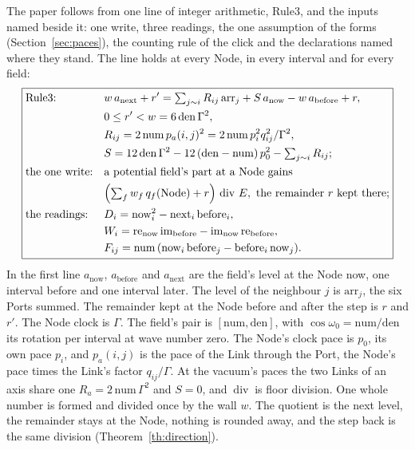 \documentclass[pdflatex,sn-mathphys-num]{sn-jnl}
\newcommand{\num}{\mathrm{num}}
\newcommand{\den}{\mathrm{den}}
\newcommand{\anow}{a_{\mathrm{now}}}
\newcommand{\abefore}{a_{\mathrm{before}}}
\newcommand{\anext}{a_{\mathrm{next}}}
\newcommand{\ddiv}{\ \mathrm{div}\ }
\theoremstyle{thmstyleone}
\theoremstyle{thmstyletwo}
\begin{document}
The paper follows from one line of integer arithmetic, Rule3, and the inputs named beside it: one write, three readings, the one assumption of the forms (Section~\ref{sec:paces}), the counting rule of the click and the declarations named where they stand. The line holds at every Node, in every interval and for every field:
\begin{equation}\label{eq:law}
\boxed{\begin{aligned}
&\text{Rule3:} && w\,\anext + r' = \textstyle\sum_{j \sim i} R_{ij}\,\mathrm{arr}_j + S\,\anow - w\,\abefore + r,\\
&&& 0 \le r' < w = 6\,\den\,\Gamma^2,\\
&&& R_{ij} = 2\,\num\,p_a(i, j)^2 = 2\,\num\,p_i^2 q_{ij}^2 / \Gamma^2,\\
&&& S = 12\,\den\,\Gamma^2 - 12\,(\den - \num)\,p_0^2 - \textstyle\sum_{j \sim i} R_{ij};\\
&\text{the one write:} && \text{a potential field's part at a Node gains}\\
&&& \Bigl(\textstyle\sum_f w_f\,q_f(\text{Node}) + r\Bigr) \ddiv E, \text{ the remainder } r \text{ kept there};\\
&\text{the readings:} && D_i = \mathrm{now}_i^2 - \mathrm{next}_i\,\mathrm{before}_i,\\
&&& W_i = \mathrm{re}_{\mathrm{now}}\,\mathrm{im}_{\mathrm{before}} - \mathrm{im}_{\mathrm{now}}\,\mathrm{re}_{\mathrm{before}},\\
&&& F_{ij} = \num\,(\mathrm{now}_i\,\mathrm{before}_j - \mathrm{before}_i\,\mathrm{now}_j).
\end{aligned}}
\end{equation}
In the first line $\anow$, $\abefore$ and $\anext$ are the field's level at the Node now, one interval before and one interval later. The level of the neighbour $j$ is $\mathrm{arr}_j$, the six Ports summed. The remainder kept at the Node before and after the step is $r$ and $r'$. The Node clock is $\Gamma$. The field's pair is $[\num, \den]$, with $\cos\omega_0 = \num / \den$ its rotation per interval at wave number zero. The Node's clock pace is $p_0$, its own pace $p_i$, and $p_a(i, j)$ is the pace of the Link through the Port, the Node's pace times the Link's factor $q_{ij} / \Gamma$. At the vacuum's paces the two Links of an axis share one $R_a = 2\,\num\,\Gamma^2$ and $S = 0$, and $\ddiv$ is floor division. One whole number is formed and divided once by the wall $w$. The quotient is the next level, the remainder stays at the Node, nothing is rounded away, and the step back is the same division (Theorem~\ref{th:direction}).
\end{document}
